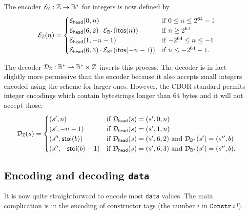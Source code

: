 \noindent 
The encoder $\mathcal{E}_{\mathbb{Z}}: \mathbb{Z} \rightarrow \mathbb{B}^*$ for integers is now defined by
$$ \mathcal{E}_{\mathbb{Z}}(n) =
\begin{cases}
  \mathcal{E}_{\mathsf{head}}(0,n)                             & \text{if $0\leq n \leq 2^{64}-1$}\\
  \mathcal{E}_{\mathsf{head}}(6,2) \cdot \mathcal{E}_{\mathbb{B}^*}(\mathsf{itos}(n))    & \text{if $n \geq 2^{64}$}\\
  \mathcal{E}_{\mathsf{head}}(1,-n-1)                          & \text{if $-2^{64} \leq n \leq -1$}\\
  \mathcal{E}_{\mathsf{head}}(6,3) \cdot \mathcal{E}_{\mathbb{B}^*}(\mathsf{itos}(-n-1)) & \text{if $n \leq -2^{64}-1$}.
\end{cases}
$$

\noindent The decoder $\mathcal{D}_{\mathbb{Z}}: \mathbb{B}^* \rightharpoonup \mathbb{B}^* \times \mathbb{Z}$ inverts this
process. The decoder is in fact slightly more permissive than the encoder
because it also accepts small integers encoded using the scheme for larger ones.
However, the CBOR standard permits integer encodings which contain bytestrings
longer than 64 bytes and it will not accept those.
$$ \mathcal{D}_{\mathbb{Z}}(s) =
\begin{cases}
  (s', n)               & \text{if $\mathcal{D}_{\mathsf{head}}(s) = (s', 0,n)$}\\
  (s', -n-1)            & \text{if $\mathcal{D}_{\mathsf{head}}(s) = (s', 1,n)$}\\
  (s'', \mathsf{stoi}(b))       & \text{if $\mathcal{D}_{\mathsf{head}}(s) = (s', 6,2)$ and $\mathcal{D}_{\mathbb{B}^*}(s') = (s'', b)$}\\
  (s'', -\mathsf{stoi}(b)-1)    & \text{if $\mathcal{D}_{\mathsf{head}}(s) = (s', 6,3)$ and $\mathcal{D}_{\mathbb{B}^*}(s') = (s'', b)$}.\\
\end{cases}
$$



\subsection{Encoding and decoding \texttt{data}}
\label{sec:encoding-data}
\newcommand\eData{\e_{\mathtt{data}}}
\newcommand\eDataStar{\e_{\mathtt{data^*}}}
\newcommand\eDataStarSq{\e_{\mathtt{(data^2)^*}}}

\newcommand\dData{\d_{\mathtt{data}}}
\newcommand\dDataStar{\d_{\mathtt{data^*}}}
\newcommand\dDataStarSq{\d_{\mathtt{(data^2)^*}}}

It is now quite straightforward to encode most \texttt{data} values.  The main
complication is in the encoding of constructor tags (the number $i$ in
$\mathtt{Constr}\: i\, l$).

